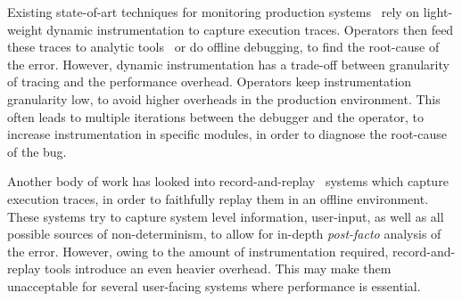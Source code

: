 
Existing state-of-art techniques for monitoring production systems~\cite{dtrace, iProbe, winetw} rely on light-weight dynamic instrumentation to capture execution traces. 
Operators then feed these traces to analytic tools~\cite{magpie,clue} or do offline debugging, to find the root-cause of the error.
However, dynamic instrumentation has a trade-off between granularity of tracing and the performance overhead. 
Operators keep instrumentation granularity low, to avoid higher overheads in the production environment.
This often leads to multiple iterations between the debugger and the operator, to increase instrumentation in specific modules, in order to diagnose the root-cause of the bug. 

Another body of work has looked into record-and-replay~\cite{odr,revirt,laadan2010transparent,geels2007friday} systems which capture execution traces, in order to faithfully replay them in an offline environment.
These systems try to capture system level information, user-input, as well as all possible sources of non-determinism, to allow for in-depth \textit{post-facto} analysis of the error.
However, owing to the amount of instrumentation required, record-and-replay tools introduce an even heavier overhead. 
This may make them unacceptable for several user-facing systems where performance is essential.


